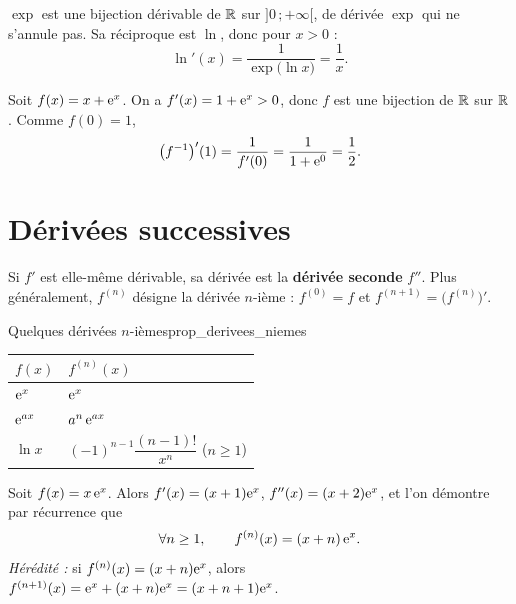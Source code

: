\begin{exemple}
	$\exp$ est une bijection dérivable de $\mathbb{R}$ sur $]0\,;+\infty[$, de dérivée
	$\exp$ qui ne s'annule pas. Sa réciproque est $\ln$, donc pour $x>0$ :
	\[
	\ln'(x)=\frac{1}{\exp\bigl(\ln x\bigr)}=\frac{1}{x}.
	\]
\end{exemple}

\begin{exemple}
	Soit $f(x)=x+\mathrm{e}^{x}$. On a $f'(x)=1+\mathrm{e}^{x}>0$, donc $f$ est une bijection
	de $\mathbb{R}$ sur $\mathbb{R}$. Comme $f(0)=1$,
	\[
	\bigl(f^{-1}\bigr)'(1)=\frac{1}{f'(0)}=\frac{1}{1+\mathrm{e}^{0}}=\frac12.
	\]
\end{exemple}


\section{Dérivées successives}

\begin{definition}
	Si $f'$ est elle-même dérivable, sa dérivée est la \textbf{dérivée seconde}
	$f''$. Plus généralement, $f^{(n)}$ désigne la dérivée $n$-ième :
	$f^{(0)}=f$ et $f^{(n+1)}=\bigl(f^{(n)}\bigr)'$.
\end{definition}

\begin{propriete}{Quelques dérivées $n$-ièmes}{prop_derivees_niemes}
	\begin{center}
	\renewcommand{\arraystretch}{1.8}
	\begin{tabular}{>{\centering\arraybackslash}p{2.6cm}
	                >{\centering\arraybackslash}p{5.4cm}}
	\hline
	$f(x)$ & $f^{(n)}(x)$ \\
	\hline
	$\mathrm{e}^{x}$   & $\mathrm{e}^{x}$ \\
	$\mathrm{e}^{ax}$  & $a^{n}\,\mathrm{e}^{ax}$ \\
	$\ln x$    & $(-1)^{n-1}\dfrac{(n-1)!}{x^{n}}$ \quad ($n\geq 1$) \\
	\hline
	\end{tabular}
	\end{center}
\end{propriete}

\begin{exemple}
	Soit $f(x)=x\,\mathrm{e}^{x}$. Alors $f'(x)=(x+1)\mathrm{e}^{x}$, $f''(x)=(x+2)\mathrm{e}^{x}$, et
	l'on démontre par récurrence que
	\[
	\forall n\geq 1,\qquad f^{(n)}(x)=(x+n)\,\mathrm{e}^{x}.
	\]
	\emph{Hérédité :} si $f^{(n)}(x)=(x+n)\mathrm{e}^{x}$, alors
	$f^{(n+1)}(x)=\mathrm{e}^{x}+(x+n)\mathrm{e}^{x}=(x+n+1)\mathrm{e}^{x}$.
\end{exemple}


